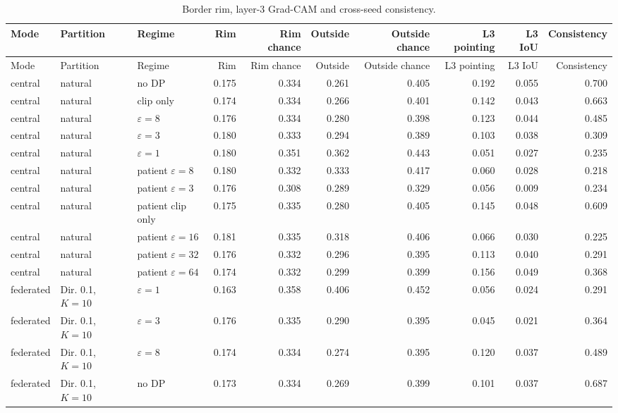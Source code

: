 {\scriptsize
\begin{longtable}{lllrrrrrrr}
\caption{Border rim, layer-3 Grad-CAM and cross-seed consistency.}\label{tab:s_border}\\
\toprule
Mode & Partition & Regime & Rim & Rim chance & Outside & Outside chance & L3 pointing & L3 IoU & Consistency \\
\midrule
\endfirsthead
\toprule
Mode & Partition & Regime & Rim & Rim chance & Outside & Outside chance & L3 pointing & L3 IoU & Consistency \\
\midrule
\endhead
\bottomrule
\endlastfoot
central & natural & no DP & 0.175 & 0.334 & 0.261 & 0.405 & 0.192 & 0.055 & 0.700 \\
central & natural & clip only & 0.174 & 0.334 & 0.266 & 0.401 & 0.142 & 0.043 & 0.663 \\
central & natural & $\varepsilon=8$ & 0.176 & 0.334 & 0.280 & 0.398 & 0.123 & 0.044 & 0.485 \\
central & natural & $\varepsilon=3$ & 0.180 & 0.333 & 0.294 & 0.389 & 0.103 & 0.038 & 0.309 \\
central & natural & $\varepsilon=1$ & 0.180 & 0.351 & 0.362 & 0.443 & 0.051 & 0.027 & 0.235 \\
central & natural & patient $\varepsilon=8$ & 0.180 & 0.332 & 0.333 & 0.417 & 0.060 & 0.028 & 0.218 \\
central & natural & patient $\varepsilon=3$ & 0.176 & 0.308 & 0.289 & 0.329 & 0.056 & 0.009 & 0.234 \\
central & natural & patient clip only & 0.175 & 0.335 & 0.280 & 0.405 & 0.145 & 0.048 & 0.609 \\
central & natural & patient $\varepsilon=16$ & 0.181 & 0.335 & 0.318 & 0.406 & 0.066 & 0.030 & 0.225 \\
central & natural & patient $\varepsilon=32$ & 0.176 & 0.332 & 0.296 & 0.395 & 0.113 & 0.040 & 0.291 \\
central & natural & patient $\varepsilon=64$ & 0.174 & 0.332 & 0.299 & 0.399 & 0.156 & 0.049 & 0.368 \\
federated & Dir. 0.1, $K{=}10$ & $\varepsilon=1$ & 0.163 & 0.358 & 0.406 & 0.452 & 0.056 & 0.024 & 0.291 \\
federated & Dir. 0.1, $K{=}10$ & $\varepsilon=3$ & 0.176 & 0.335 & 0.290 & 0.395 & 0.045 & 0.021 & 0.364 \\
federated & Dir. 0.1, $K{=}10$ & $\varepsilon=8$ & 0.174 & 0.334 & 0.274 & 0.395 & 0.120 & 0.037 & 0.489 \\
federated & Dir. 0.1, $K{=}10$ & no DP & 0.173 & 0.334 & 0.269 & 0.399 & 0.101 & 0.037 & 0.687 \\

\end{longtable}}
